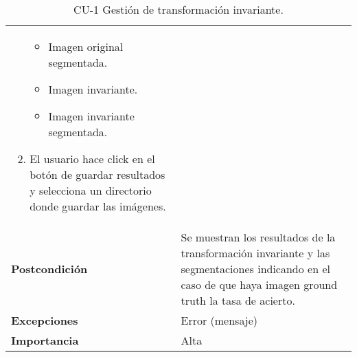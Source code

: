 \begin{table}[p]
\begin{tabularx}{\linewidth}{ p{} p{} }
\begin{enumerate}
\begin{itemize}
                \item Imagen original segmentada.
                \item Imagen invariante.
                \item Imagen invariante segmentada.
            \end{itemize}
            \item El usuario hace click en el botón de guardar resultados y selecciona un directorio donde guardar las imágenes.
		\end{enumerate}\\
		\textbf{Postcondición}        & Se muestran los resultados de la transformación invariante y las segmentaciones indicando en el caso de que haya imagen ground truth la tasa de acierto.\\
		\textbf{Excepciones}          & Error (mensaje) \\
		\textbf{Importancia}          & Alta \\
		\bottomrule
	\end{tabularx}
	\caption{CU-1 Gestión de transformación invariante.}
\end{table}

